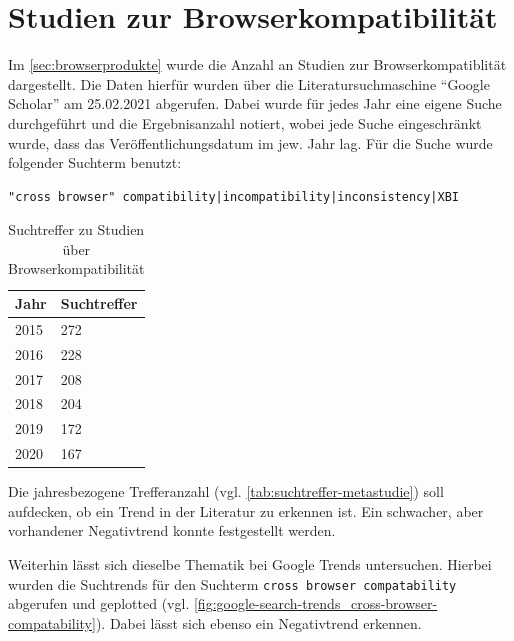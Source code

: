 \section{Studien zur Browserkompatibilität}
\label{sec:studien-zur-browser-kompatibilitaet}

Im \autoref{sec:browserprodukte} wurde die Anzahl an Studien zur Browserkompatiblität dargestellt. Die Daten hierfür wurden über die Literatursuchmaschine \enquote{Google Scholar} am 25.02.2021 abgerufen. Dabei wurde für jedes Jahr eine eigene Suche durchgeführt und die Ergebnisanzahl notiert, wobei jede Suche eingeschränkt wurde, dass das Veröffentlichungsdatum im jew. Jahr lag. Für die Suche wurde folgender Suchterm benutzt:
\begin{verbatim}
"cross browser" compatibility|incompatibility|inconsistency|XBI
\end{verbatim}

\begin{table}
\centering
\vspace{-\baselineskip}
\begin{tabular}{|l|l|}
  \hline
  Jahr & Suchtreffer \\
  \hline
  2015 & 272 \\
  \hline
  2016 & 228 \\
  \hline
  2017 & 208 \\
  \hline
  2018 & 204 \\
  \hline
  2019 & 172 \\
  \hline
  2020 & 167 \\
  \hline
\end{tabular}
\caption{Suchtreffer zu Studien über Browserkompatibilität}
	\label{tab:suchtreffer-metastudie}
\end{table}

\def\lc{\left\lceil}   
\def\rc{\right\rceil}

Die jahresbezogene Trefferanzahl (vgl. \autoref{tab:suchtreffer-metastudie}) soll aufdecken, ob ein Trend in der Literatur zu erkennen ist. Ein schwacher, aber vorhandener Negativtrend konnte festgestellt werden.

Weiterhin lässt sich dieselbe Thematik bei Google Trends \cite{GoogleTrendsCrossBrowserCompatibility} untersuchen. Hierbei wurden die Suchtrends für den Suchterm \texttt{cross browser compatability} abgerufen und geplotted (vgl. \autoref{fig:google-search-trends_cross-browser-compatability}). Dabei lässt sich ebenso ein Negativtrend erkennen.

